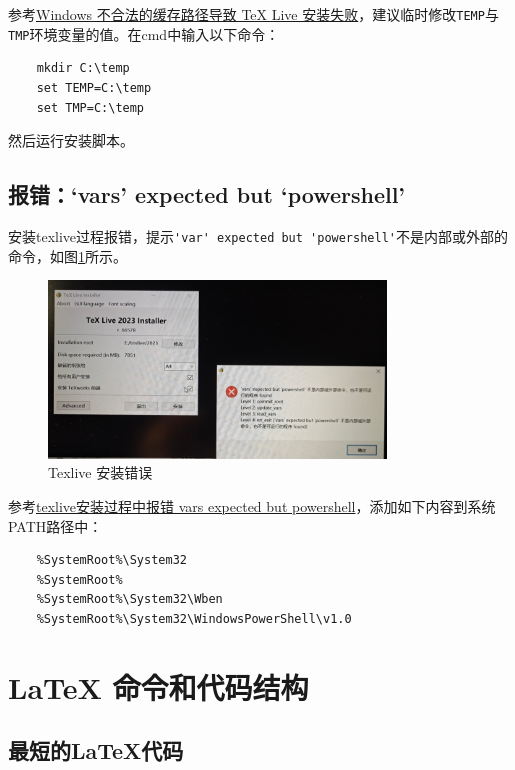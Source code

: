参考\href{https://syvshc.github.io/2021-04-07-illegal-temp-cause-tlinstall-failure/}{Windows 不合法的缓存路径导致 TeX Live 安装失败}，建议临时修改\lstinline{TEMP}与\lstinline{TMP}环境变量的值。在cmd中输入以下命令：
\begin{lstlisting}
    mkdir C:\temp
    set TEMP=C:\temp
    set TMP=C:\temp
\end{lstlisting}

然后运行安装脚本。

\subsection{报错：`vars' expected but `powershell'}\label{subsec:varexpected}
安装texlive过程报错，提示\lstinline{'var' expected but 'powershell'}不是内部或外部的命令，如图\ref{fig:varexpected}所示。
\begin{figure}[!h]
    \centering
    \includegraphics[width=0.8\textwidth]{figure/chap-basic/varexpected.png}
    \caption{Texlive 安装错误}
    \label{fig:varexpected}
\end{figure}

参考\href{https://blog.csdn.net/qq_50698753/article/details/130475564}{texlive安装过程中报错 vars expected but powershell}，添加如下内容到系统PATH路径中：
\begin{lstlisting}
    %SystemRoot%\System32
    %SystemRoot%
    %SystemRoot%\System32\Wben
    %SystemRoot%\System32\WindowsPowerShell\v1.0
\end{lstlisting}







\section{\LaTeX{} 命令和代码结构}\label{sec:latexstructure}
\subsection{最短的\LaTeX{}代码}\label{subsec:shortlatexcode}


